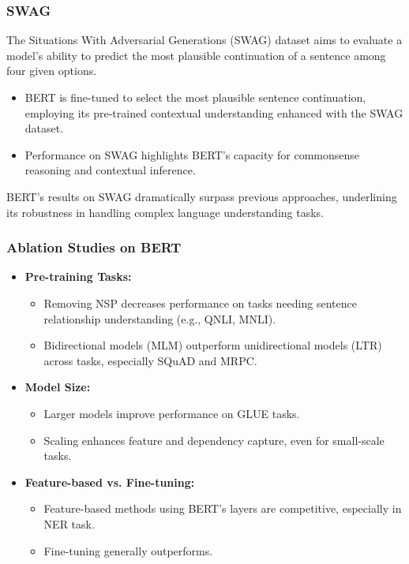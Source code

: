 \documentclass[11pt,xcolor={dvipsnames},hyperref={pdftex,pdfpagemode=UseNone,hidelinks,pdfdisplaydoctitle=true},usepdftitle=false]{beamer}
\begin{document}
\begin{frame}
\frametitle{SWAG}
The Situations With Adversarial Generations (SWAG) dataset aims to evaluate a model's ability to predict the most plausible continuation of a sentence among four given options.
\begin{itemize}
    \item BERT is fine-tuned to select the most plausible sentence continuation, employing its pre-trained contextual understanding enhanced with the SWAG dataset.
    \item Performance on SWAG highlights BERT's capacity for commonsense reasoning and contextual inference.
\end{itemize}
BERT's results on SWAG dramatically surpass previous approaches, underlining its robustness in handling complex language understanding tasks.
\end{frame}

\begin{frame}
    \frametitle{Ablation Studies on BERT}
    \begin{itemize}
        \item \textbf{Pre-training Tasks:}
        \begin{itemize}
            \item Removing NSP decreases performance on tasks needing sentence relationship understanding (e.g., QNLI, MNLI).
            \item Bidirectional models (MLM) outperform unidirectional models (LTR) across tasks, especially SQuAD and MRPC.
        \end{itemize}
        \item \textbf{Model Size:}
        \begin{itemize}
            \item Larger models improve performance on GLUE tasks.
            \item Scaling enhances feature and dependency capture, even for small-scale tasks.
        \end{itemize}
        \item \textbf{Feature-based vs. Fine-tuning:}
        \begin{itemize}
            \item Feature-based methods using BERT's layers are competitive, especially in NER task.
            \item Fine-tuning generally outperforms.
        \end{itemize}
    \end{itemize}
\end{frame}
    
\end{document}
